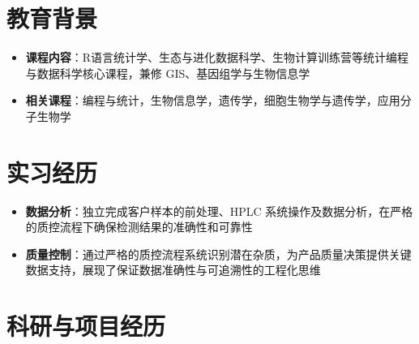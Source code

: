 \documentclass{my-resume}
\begin{document}


\section{教育背景}
\begin{itemize}[parsep=0.2ex]
  \item \textbf{课程内容}：R语言统计学、生态与进化数据科学、生物计算训练营等统计编程与数据科学核心课程，兼修 GIS、基因组学与生物信息学
\end{itemize}
\begin{itemize}[parsep=0.2ex]
  \item \textbf{相关课程}：编程与统计，生物信息学，遗传学，细胞生物学与遗传学，应用分子生物学
\end{itemize}

\section{实习经历}
\begin{itemize}[parsep=0.2ex]
  \item \textbf{数据分析}：独立完成客户样本的前处理、HPLC 系统操作及数据分析，在严格的质控流程下确保检测结果的准确性和可靠性
  \item \textbf{质量控制}：通过严格的质控流程系统识别潜在杂质，为产品质量决策提供关键数据支持，展现了保证数据准确性与可追溯性的工程化思维
\end{itemize}

\section{科研与项目经历}
\end{document}
